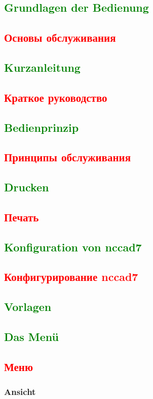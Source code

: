 \documentclass[14pt,a4paper]{book}
\newcommand{\DE}[1]{\textcolor{green}{#1}}
\newcommand{\RU}[1]{\textcolor{red}{#1}}
\begin{document}
\DE{\chapter{Grundlagen der Bedienung}}
\RU{\chapter{Основы обслуживания}}
	\DE{\section{Kurzanleitung}}
	\RU{\section{Краткое руководство}}
	\DE{\section{Bedienprinzip}}
	\RU{\section{Принципы обслуживания}}
	\DE{\section{Drucken}}
	\RU{\section{Печать}}
	\DE{\section{Konfiguration von nccad7}}
	\RU{\section{Конфигурирование nccad7}}
	\DE{\section{Vorlagen}}
	\DE{\section{Das Menü}}
	\RU{\section{Меню}}
		\subsection{Ansicht}
\end{document}
